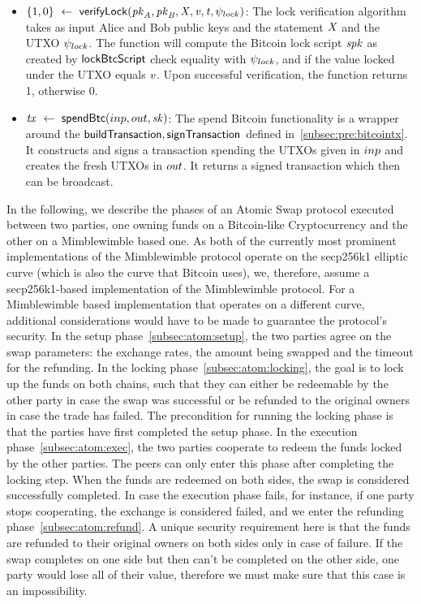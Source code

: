 \begin{itemize}
    \item $\{ 1,0 \} ~\leftarrow~ \mathsf{verifyLock} (\mathit{pk}_{\mathit{A}},\mathit{pk}_{\mathit{B}},\mathit{X},\mathit{v},\mathit{t},\psi_{lock})$:
    The lock verification algorithm takes as input Alice and Bob public keys and the statement $\mathit{X}$ and the UTXO $\psi_{lock}$.
    The function will compute the Bitcoin lock script $\mathit{spk}$ as created by $\mathsf{lockBtcScript}$ check equality with $\psi_{lock}$, and if the value locked under the UTXO equals $\mathit{v}$.
    Upon successful verification, the function returns 1, otherwise 0.
    \item $\mathit{tx} ~\leftarrow~ \mathsf{spendBtc}(inp,out,\mathit{sk})$:
    The spend Bitcoin functionality is a wrapper around the $\mathsf{buildTransaction}, \mathsf{signTransaction}$ defined in~\cref{subsec:pre:bitcointx}.
    It constructs and signs a transaction spending the UTXOs given in $inp$ and creates the fresh UTXOs in $out$.
    It returns a signed transaction which then can be broadcast.
\end{itemize}


In the following, we describe the phases of an Atomic Swap protocol executed between two parties, one owning funds on a Bitcoin-like Cryptocurrency and the other on a Mimblewimble based one.
As both of the currently most prominent implementations of the Mimblewimble protocol operate on the secp256k1 elliptic curve (which is also the curve that Bitcoin uses), we, therefore, assume a secp256k1-based implementation of the Mimblewimble protocol.
For a Mimblewimble based implementation that operates on a different curve, additional considerations would have to be made to guarantee the protocol's security.
In the setup phase~\cref{subsec:atom:setup}, the two parties agree on the swap parameters: the exchange rates, the amount being swapped and the timeout for the refunding.
In the locking phase~\cref{subsec:atom:locking}, the goal is to lock up the funds on both chains, such that they can either be redeemable by the other party in case the swap was successful or be refunded to the original owners in case the trade has failed.
The precondition for running the locking phase is that the parties have first completed the setup phase.
In the execution phase~\cref{subsec:atom:exec}, the two parties cooperate to redeem the funds locked by the other parties.
The peers can only enter this phase after completing the locking step.
When the funds are redeemed on both sides, the swap is considered successfully completed.
In case the execution phase fails, for instance, if one party stops cooperating, the exchange is considered failed, and we enter the refunding phase~\cref{subsec:atom:refund}.
A unique security requirement here is that the funds are refunded to their original owners on both sides only in case of failure.
If the swap completes on one side but then can't be completed on the other side, one party would lose all of their value, therefore we must make sure that this case is an impossibility.

